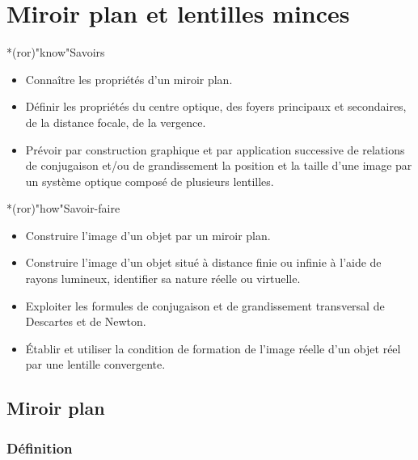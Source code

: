 \documentclass[../../main/main.tex]{subfiles}
\begin{document}
\setcounter{chapter}{2}

\chapter{Miroir plan et lentilles minces}

\vfill

\begin{prgm}
	\begin{tcb}*(ror)"know"{Savoirs}
		\begin{itemize}[label=$\diamond$, leftmargin=10pt]
			\item Connaître les propriétés d'un miroir plan.
			\item Définir les propriétés du centre optique, des foyers principaux et
			      secondaires, de la distance focale, de la vergence.
			\item Prévoir par construction graphique et par application successive de
			      relations de conjugaison et/ou de grandissement la position et la taille
			      d’une image par un système optique composé de plusieurs lentilles.
		\end{itemize}
	\end{tcb}

	\begin{tcb}*(ror)"how"{Savoir-faire}
		\begin{itemize}[label=$\diamond$, leftmargin=10pt]
			\item Construire l’image d’un objet par un miroir plan.
			\item Construire l’image d’un objet situé à distance finie ou infinie à
			      l’aide de rayons lumineux, identifier sa nature réelle ou virtuelle.
			\item Exploiter les formules de conjugaison et de grandissement
			      transversal de Descartes et de Newton.
			\item Établir et utiliser la condition de formation de l’image réelle
			      d’un objet réel par une lentille convergente.
		\end{itemize}
	\end{tcb}
\end{prgm}

\vfill
\minitoc
\vfill

\newpage

\section{Miroir plan}
\subsection{Définition}
\end{document}
